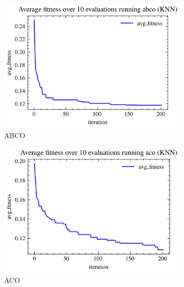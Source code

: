 \begin{figure}[H]
    \centering
    \begin{subfigure}[b]{0.3\textwidth}
        \centering
        \includegraphics[width=\textwidth]{imagenes/binary_knn_fitness/KNN_fitness_over_10_evaluations_abco_binary_breast-cancer.jpg}
        \caption{ABCO}
        \label{fig:sub1}
    \end{subfigure}
    \hfill
    \begin{subfigure}[b]{0.3\textwidth}
        \centering
        \includegraphics[width=\textwidth]{imagenes/binary_knn_fitness/KNN_fitness_over_10_evaluations_aco_binary_breast-cancer.jpg}
        \caption{ACO}
        \label{fig:sub2}
    \end{subfigure}
    \hfill
    \begin{subfigure}[b]{0.3\textwidth}

\end{subfigure}
\end{figure}
